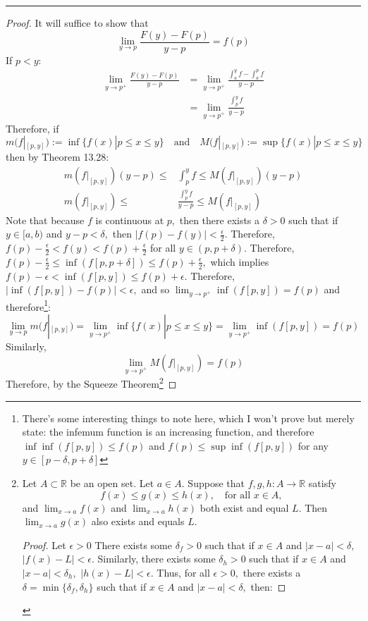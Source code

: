 \documentclass[openany, amssymb, psamsfonts]{amsart}
\newcommand{\bbR}{\mathbb{R}}
\theoremstyle{definition}
\numberwithin{equation}{section}
\begin{document}
\vspace{4pt}     \hrule   \vspace{4pt}  \begin{proof}
It will suffice to show that \[\lim_{y\to p}\frac{F(y) - F(p)}{y-p} = f(p)\]
If $p<y:$
\begin{align*}
\lim_{y\to p^+}\frac{F(y) - F(p)}{y-p} &= \lim_{y\to p^+}\frac{\int_a^yf - \int_a^p f}{y-p}\\
&= \lim_{y\to p^+}\frac{\int_p^yf}{y-p}
\end{align*}
Therefore, if \[m(f|_{[p,y]}) := \inf\{f(x)| p\leq x \leq y\} \quad \text{and} \quad M(f|_{[p,y]}) := \sup\{f(x)| p\leq x \leq y\}\]
then by Theorem 13.28:
\begin{align*}
m(f|_{[p,y]})(y-p) \leq &\int_p^yf \leq M(f|_{[p,y]})(y-p)\\
m(f|_{[p,y]}) \leq &\frac{\int_p^yf}{y-p} \leq M(f|_{[p,y]})
\end{align*}
Note that because $f$ is continuous at $p,$ then there exists a $\delta>0$ such that if $y\in [a,b)$ and $y-p< \delta,$ then $|f(p) - f(y)|< \frac{\epsilon}{2}.$ Therefore, $f(p) - \frac{\epsilon}{2}< f(y) < f(p) + \frac{\epsilon}{2}$ for all $y\in (p, p+ \delta).$ Therefore, $f(p) - \frac{\epsilon}{2} \leq \inf(f[p,p+\delta])\leq f(p) + \frac{\epsilon}{2},$ which implies $f(p) - \epsilon < \inf(f[p,y])\leq f(p) + \epsilon.$ Therefore, $|\inf(f[p,y]) - f(p)|< \epsilon,$ and so $\lim_{y\to p^+}\inf(f[p,y]) = f(p)$ and therefore\footnote{There's some interesting things to note here, which I won't prove but merely state: the infemum function is an increasing function, and therefore $\inf\inf(f[p,y])\leq f(p)$ and $f(p)\leq \sup\inf(f[p,y])$ for any $y\in [p-\delta, p+\delta]$}: \[\lim_{y\to p}m(f|_{[p,y]}) = \lim_{y\to p^+}\inf\{f(x)| p\leq x \leq y\} = \lim_{y\to p^+}\inf(f[p,y]) = f(p)\]
Similarly, 
\[\lim_{y\to p^+}M(f|_{[p,y]}) = f(p)\]
Therefore, by the Squeeze Theorem\footnote{Let $A\subset \bbR$ be an open set. Let $a\in A.$ Suppose that $f,g,h\colon A\to \bbR$ satisfy
$$f(x)\leq g(x)\leq h(x),\quad \text{for all } x\in A,$$
and $\displaystyle \lim_{x\to a}f(x)$ and $\displaystyle \lim_{x\to a} h(x)$ both exist and equal $L.$ Then $\displaystyle \lim_{x\to a} g(x)$ also exists and equals $L.$ \begin{proof}
Let $\epsilon>0$
    There exists some $\delta_f >0$ such that if $x\in A$ and $|x-a|< \delta,$ $|f(x) - L| < \epsilon.$ Similarly, there exists some $\delta_h >0$ such that if $x\in A$ and $|x-a|< \delta_h,$ $|h(x) - L| < \epsilon.$ Thus, for all $\epsilon>0,$ there exists a $\delta = \min\{\delta_f, \delta_h\}$ such that if $x\in A$ and $|x-a|<\delta,$ then: 

\end{proof}}
\end{proof}
\end{document}
